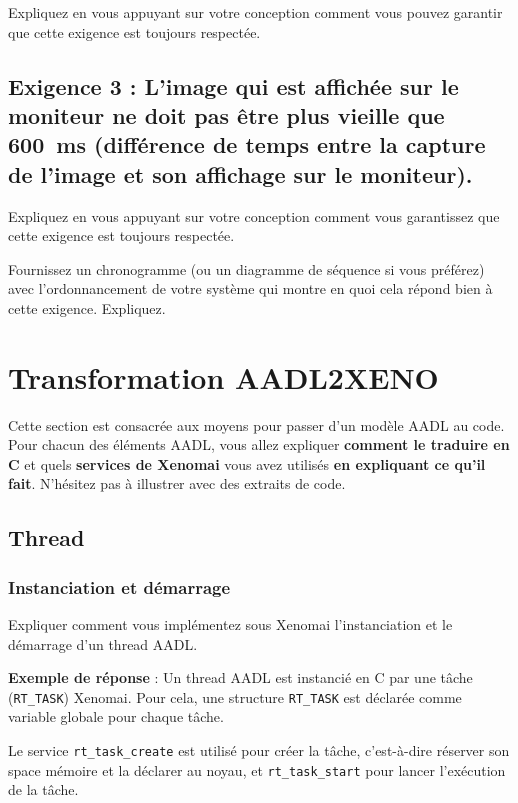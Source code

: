 \documentclass[11pt, a4paper]{paper}
\begin{document}
{\color{blue} Expliquez en vous appuyant sur votre conception comment vous pouvez garantir que cette exigence est toujours respectée.}

\subsection{Exigence 3 : 
L'image qui est  affichée sur le moniteur ne doit pas être plus vieille que 600~ms (différence de temps entre la capture de l'image et son affichage sur le moniteur).}

{\color{blue} Expliquez en vous appuyant sur votre conception comment vous garantissez que cette exigence est toujours respectée.}

{\color{blue} Fournissez un chronogramme (ou un diagramme de séquence si vous préférez) avec l’ordonnancement de votre système qui montre en quoi cela répond bien à cette exigence. Expliquez.}


\section{Transformation AADL2XENO}
 
 {\color{red} Cette section est consacrée aux moyens pour passer d'un modèle AADL au code. Pour chacun des éléments AADL, vous allez expliquer {\bf comment le traduire en C} et quels {\bf services de Xenomai} vous avez utilisés {\bf en expliquant ce qu'il fait}. N'hésitez pas à illustrer avec des extraits de code.}
 
\subsection{Thread}
\subsubsection{Instanciation et démarrage}
 {\color{blue} Expliquer comment vous implémentez sous Xenomai l'instanciation et le démarrage d'un  thread AADL.}
 
{\color{blue} {\bf Exemple de réponse} : Un thread AADL est instancié en C par une tâche ({\tt RT\_TASK}) Xenomai.  Pour cela, une structure {\tt RT\_TASK} est déclarée comme variable globale pour chaque tâche.

Le service {\tt rt\_task\_create} est utilisé pour créer la tâche, c'est-à-dire réserver son space mémoire et la déclarer au noyau, et {\tt rt\_task\_start} pour lancer l'exécution de la tâche.}
\end{document}
